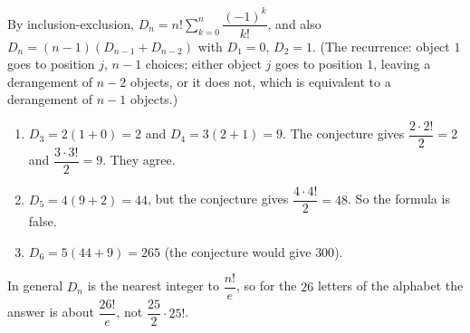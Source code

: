 By inclusion-exclusion, $D_n=n!\sum_{k=0}^n\dfrac{(-1)^k}{k!}$, and also $D_n=(n-1)(D_{n-1}+D_{n-2})$ with $D_1=0$, $D_2=1$. (The recurrence: object $1$ goes to position $j$, $n-1$ choices; either object $j$ goes to position $1$, leaving a derangement of $n-2$ objects, or it does not, which is equivalent to a derangement of $n-1$ objects.)
\begin{enumerate}
\item $D_3=2(1+0)=2$ and $D_4=3(2+1)=9$. The conjecture gives $\dfrac{2\cdot2!}{2}=2$ and $\dfrac{3\cdot3!}2=9$. They agree.
\item $D_5=4(9+2)=\boxed{44}$, but the conjecture gives $\dfrac{4\cdot4!}{2}=48$. So the formula is false.
\item $D_6=5(44+9)=\boxed{265}$ (the conjecture would give $300$).
\end{enumerate}
In general $D_n$ is the nearest integer to $\dfrac{n!}{e}$, so for the $26$ letters of the alphabet the answer is about $\dfrac{26!}{e}$, not $\dfrac{25}{2}\cdot25!$.
